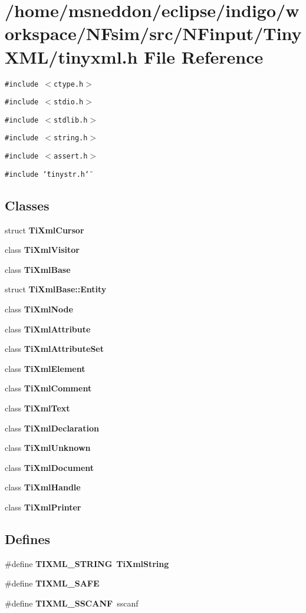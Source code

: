 \section{/home/msneddon/eclipse/indigo/workspace/NFsim/src/NFinput/TinyXML/tinyxml.h File Reference}
\label{tinyxml_8h}


{\tt \#include $<$ctype.h$>$}\par
{\tt \#include $<$stdio.h$>$}\par
{\tt \#include $<$stdlib.h$>$}\par
{\tt \#include $<$string.h$>$}\par
{\tt \#include $<$assert.h$>$}\par
{\tt \#include \char`\"{}tinystr.h\char`\"{}}\par
\subsection*{Classes}
\begin{CompactItemize}
\item 
struct {\bf TiXmlCursor}
\item 
class {\bf TiXmlVisitor}
\item 
class {\bf TiXmlBase}
\item 
struct \textbf{TiXmlBase::Entity}
\item 
class {\bf TiXmlNode}
\item 
class {\bf TiXmlAttribute}
\item 
class {\bf TiXmlAttributeSet}
\item 
class {\bf TiXmlElement}
\item 
class {\bf TiXmlComment}
\item 
class {\bf TiXmlText}
\item 
class {\bf TiXmlDeclaration}
\item 
class {\bf TiXmlUnknown}
\item 
class {\bf TiXmlDocument}
\item 
class {\bf TiXmlHandle}
\item 
class {\bf TiXmlPrinter}
\end{CompactItemize}
\subsection*{Defines}
\begin{CompactItemize}
\item 
\#define {\bf TIXML\_\-STRING}~{\bf TiXmlString}
\item 
\#define {\bf TIXML\_\-SAFE}
\item 
\#define {\bf TIXML\_\-SSCANF}~sscanf
\end{CompactItemize}
